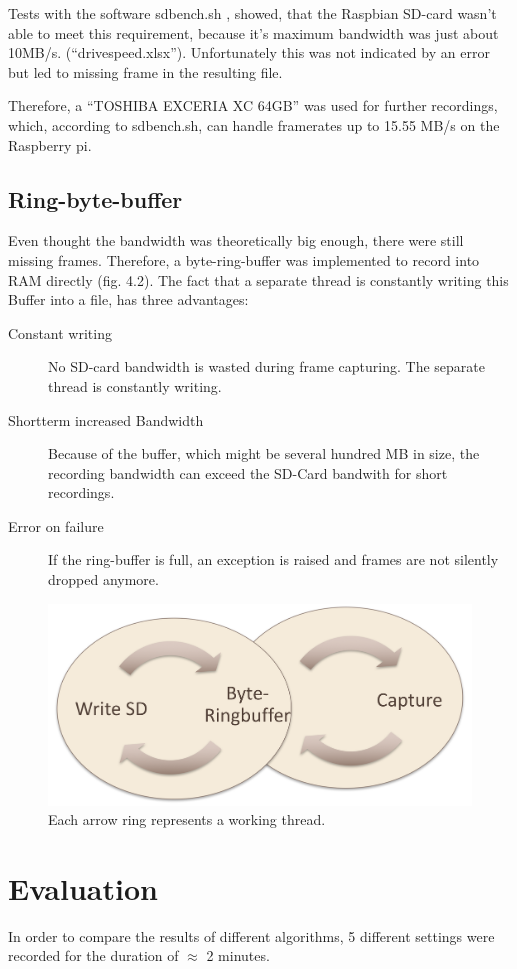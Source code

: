 Tests with the software sdbench.sh \cite{sdbench}, showed, that the Raspbian SD-card wasn't able to meet this requirement, because it's maximum  bandwidth was just about 10MB/s. (\enquote{drivespeed.xlsx}). Unfortunately this was not indicated by an error but led to missing frame in the resulting file.

Therefore, a \enquote{TOSHIBA EXCERIA XC 64GB} was used for further recordings, which, according to sdbench.sh, can handle framerates up to 15.55 MB/s on the Raspberry pi.

\subsection{Ring-byte-buffer}
Even thought the bandwidth was theoretically big enough, there were still missing frames. Therefore, a byte-ring-buffer was implemented to record into RAM directly (fig. 4.2). The fact that a separate thread is constantly writing this Buffer into a file, has three advantages:
\begin{description}
	\item[Constant writing] No SD-card bandwidth is wasted during frame capturing. The separate thread is constantly writing.
	\item[Shortterm increased Bandwidth] Because of the buffer, which might be several hundred MB in size, the recording bandwidth can exceed the SD-Card bandwith for short recordings.
	\item[Error on failure] If the ring-buffer is full, an exception is raised and frames are not silently dropped anymore.
\end{description}

\begin{figure}[h!]
	\centering
	\includegraphics[width=0.9\linewidth]{bin/ringbuffer}
	\caption{Each arrow ring represents a working thread. }
	\label{fig:ringbuffer}
\end{figure} 

\section{Evaluation}
\label{sec:sequences}
In order to compare the results of different algorithms, 5 different settings were recorded for the duration of $\approx$ 2 minutes. 

